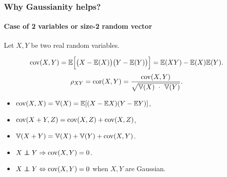 \begin{frame}
  \frametitle{Why Gaussianity helps?}
  \framesubtitle{Case of 2 variables or size-2 random vector}

  Let $X,Y$ be two real random variables.
  
  \begin{definitions}
    \vspace{-.5cm}
    \begin{equation*}
      \mathrm{cov}(X,Y)   =  \mathbb{E}\Big[\big(X-\mathbb{E}(X)\big)\big(Y-\mathbb{E}(Y)\big)\Big]  =
      \mathbb{E}(XY) - \mathbb{E}(X)\mathbb{E}(Y).
    \end{equation*}
    \begin{equation*}
      \rho_{XY} = \mathrm{cor}(X,Y) = \frac{\mathrm{cov}(X,Y)}{\sqrt{\mathbb{V}(X) \ \cdot \ \mathbb{V}(Y)}}.
    \end{equation*}
  \end{definitions}
  
  \begin{proposition}
    \vspace{-.25cm}
    \begin{itemize}
    \item $\mathrm{cov}(X,X) = \mathbb{V}(X) = \mathbb{E}[(X-\mathbb{E} X)(Y-\mathbb{E} Y)]$,
    \item $\mathrm{cov}(X+Y,Z) = \mathrm{cov}(X,Z) + \mathrm{cov}(X,Z)$,
    \item $\mathbb{V}(X+Y) = \mathbb{V}(X) + \mathbb{V}(Y) + \mathrm{cov}(X,Y)$.
    \item $X \indep Y \Rightarrow\cov(X,Y) = 0$.
    \item<2> \alert{$X  \indep Y  \Leftrightarrow \cov(X,Y) =  0$ when
        $X,Y$ are Gaussian}.
    \end{itemize}
  \end{proposition}
\end{frame}

